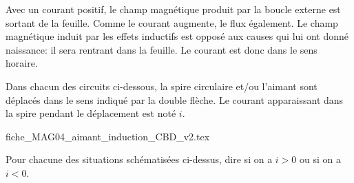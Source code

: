 \reponse{\reponseB{}}

\begin{corrige}
	Avec un courant positif, le champ magnétique produit par la boucle externe est sortant de la feuille. Comme le courant augmente, le flux également. Le champ magnétique induit par les effets inductifs est opposé aux causes qui lui ont donné naissance: il sera rentrant dans la feuille. Le courant est donc dans le sens horaire.
\end{corrige}


\finEntrainement










\hauteurLargeurCadreReponse		{8mm}{2cm}
\initialisationEntrainement

Dans chacun des circuits ci-dessous, la spire circulaire et/ou l'aimant sont déplacés dans le sens indiqué par la double flèche. Le courant apparaissant dans la spire pendant le déplacement est noté $i$.

\begin{center}
{fiche_MAG04_aimant_induction_CBD_v2.tex}
\end{center}

Pour chacune des situations schématisées ci-dessus, dire si on a $i>0$ ou si on a $i<0$. 

\debutEntrainement

